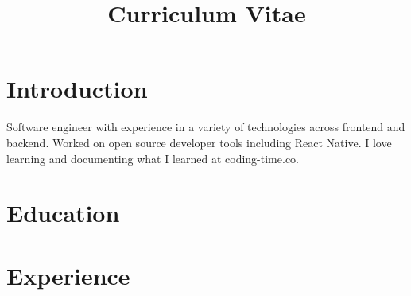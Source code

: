 \documentclass[11pt,a4paper,sans]{moderncv} %
\title{Curriculum Vitae}
\begin{document}

\makecvtitle %


\section{Introduction}

Software engineer with experience in a variety of technologies across frontend and backend. Worked on open source developer tools including React Native. I love learning and documenting what I learned at coding-time.co.


\section{Education}



\section{Experience}


\end{document}
